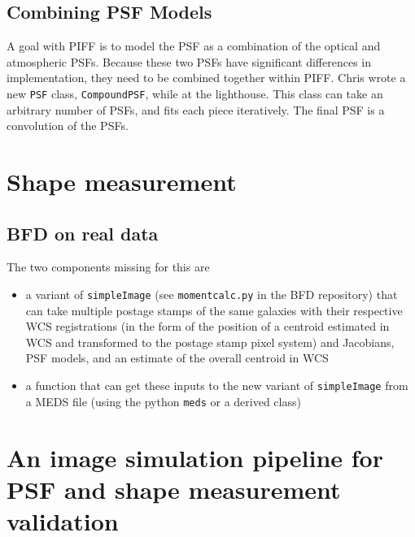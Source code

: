 \documentclass[\docopts]{\docclass}
\begin{document}
\subsection{Combining PSF Models}

A goal with PIFF is to model the PSF as a combination of the optical and atmospheric PSFs.
Because these two PSFs have significant differences in implementation, they need to be combined together within PIFF.
Chris wrote a new \texttt{PSF} class, \texttt{CompoundPSF}, while at the lighthouse.
This class can take an arbitrary number of PSFs, and fits each piece iteratively.
The final PSF is a convolution of the PSFs.

\section{Shape measurement}


\subsection{BFD on real data}


The two components missing for this are
\begin{itemize}
\item a variant of \texttt{simpleImage} (see \texttt{momentcalc.py} in the BFD repository) that can take multiple postage stamps of the same galaxies with their respective WCS registrations (in the form of the position of a centroid estimated in WCS and transformed to the postage stamp pixel system) and Jacobians, PSF models, and an estimate of the overall centroid in WCS 
\item a function that can get these inputs to the new variant of \texttt{simpleImage} from a MEDS file (using the python \texttt{meds} or a derived class) 
\end{itemize}



\section{An image simulation pipeline for PSF and shape measurement validation}

\end{document}
